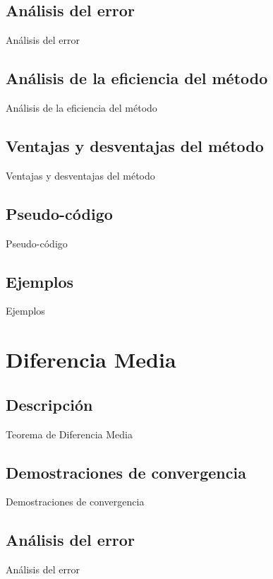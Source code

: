 \documentclass[journal,transmag]{IEEEtran}
\theoremstyle{mytheoremstyle}
\theoremstyle{mytheoremstyle}
\theoremstyle{myproblemstyle}
\begin{document}
\subsection{Análisis del error}
\begin{lipsum}
    Análisis del error
\end{lipsum}
\subsection{Análisis de la eficiencia del método}
\begin{lipsum}
    Análisis de la eficiencia del método
\end{lipsum}
\subsection{Ventajas y desventajas del método}
\begin{lipsum}
    Ventajas y desventajas del método
\end{lipsum}
\subsection{Pseudo-código}
\begin{lipsum}
    Pseudo-código
\end{lipsum}
\subsection{Ejemplos}
\begin{lipsum}
    Ejemplos
\end{lipsum}
\section{Diferencia Media}
\subsection{Descripción}
\begin{lipsum}
    Teorema de Diferencia Media
\end{lipsum}
\subsection{Demostraciones de convergencia}
\begin{lipsum}
    Demostraciones de convergencia
\end{lipsum}
\subsection{Análisis del error}
\begin{lipsum}
    Análisis del error
\end{lipsum}
\end{document}
